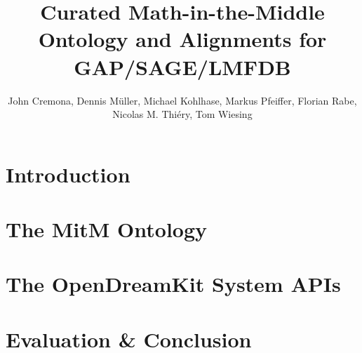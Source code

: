 \documentclass{deliverablereport}
\title{Curated Math-in-the-Middle Ontology and Alignments for GAP/SAGE/LMFDB}
\author{John Cremona, Dennis M\"uller, Michael Kohlhase, Markus Pfeiffer, Florian Rabe, Nicolas M. Thiéry, Tom Wiesing}
\begin{document}
\maketitle
\begin{abstract}
\end{abstract}
\tableofcontents\newpage

\section{Introduction}\label{sec:intro}
\newpage

\section{The MitM Ontology}\label{sec:mitmonto}
\newpage

\section{The OpenDreamKit System APIs}\label{sec:sysapis}
\newpage

\section{Evaluation \& Conclusion}\label{sec:concl}
\newpage
\printbibliography\newpage

\begin{appendix}
  
  
\end{appendix}
\end{document}
